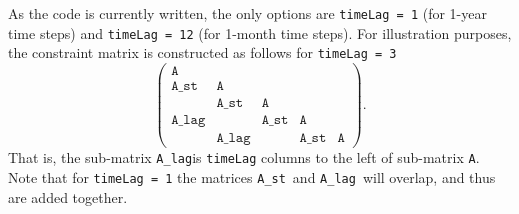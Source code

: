 \documentclass[11pt]{article}
\newcommand{\A}{\texttt{A}}
\newcommand{\Ast}{\texttt{A\_st}}
\newcommand{\Alag}{\texttt{A\_lag}}
\begin{document}
As the code is currently written, the only options are \texttt{timeLag = 1} (for 1-year time steps) and \texttt{timeLag = 12} (for 1-month time steps).
For illustration purposes, the constraint matrix is constructed as follows for \texttt{timeLag = 3}
\[
	\left(
	\begin{array}{ccccc}
		\A    &       &      &      &    \\
		\Ast  & \A    &      &      &    \\
		      & \Ast  & \A   &      &    \\
		\Alag &       & \Ast & \A   &    \\
		      & \Alag &      & \Ast & \A
	\end{array}
	\right).
\]
That is, the sub-matrix \Alag is \texttt{timeLag} columns to the left of sub-matrix \A.
Note that for \texttt{timeLag = 1} the matrices \Ast\ and \Alag\ will overlap, and thus are added together.
\end{document}
